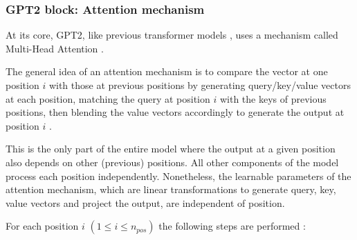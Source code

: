\subsubsection{GPT2 block: Attention mechanism}
\label{gpt2_attn}




At its core, GPT2, like previous transformer models , uses a mechanism called Multi-Head Attention .

The general idea of an attention mechanism is to compare the vector at one position $i$ with those at previous positions by generating query/key/value vectors at each position, matching the query at position $i$ with the keys of previous positions, then blending the value vectors accordingly to generate the output at position $i$ \cite{alammar-transformer} \cite{alammar-gpt2}.

This is the only part of the entire model where the output at a given position also depends on other (previous) positions. All other components of the model process each position independently.
Nonetheless, the learnable parameters of the attention mechanism, which are linear transformations to generate query, key, value vectors and project the output, are independent of position.


For each position $i$ $(1 \leq i \leq n_{pos})$ the following steps are performed  \cite{alammar-transformer} \cite{alammar-gpt2}:


